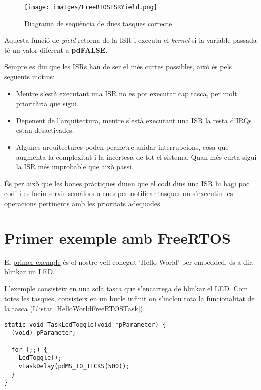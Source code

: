 \begin{figure}
 \centering
 \texttt{[image: imatges/FreeRTOSISRYield.png]}
 \caption{Diagrama de seqüència de dues tasques correcte}
 \label{fig:FreeRTOSISRYield}
\end{figure}

Aquesta funció de {\em yield} retorna de la ISR i executa el {\em kernel} si la variable passada té un valor diferent a {\bf pdFALSE}.

Sempre es diu que les \glspl{ISR} han de ser el més curtes possibles, això és pels següents motius:
\begin{itemize}
 \item Mentre s'està executant una \gls{ISR} no es pot executar cap tasca, per molt prioritària que sigui.
 \item Depenent de l'arquitectura, mentre s'està executant una ISR la resta d'\glspl{IRQ} estan desactivades.
 \item Algunes arquitectures poden permetre anidar interrupcions, cosa que augmenta la complexitat i la incertesa de tot el sistema. Quan més curta sigui la ISR més improbable que això passi.
\end{itemize}

És per això que les bones pràctiques diuen que el codi dins una \gls{ISR} hi hagi poc codi i es facin servir semàfors o cues per notificar tasques on s'executin les operacions pertinents amb les prioritats adequades.

\chapter{Primer exemple amb FreeRTOS}
\label{sec:FreeRTOS_exemple_1}
El \href{https://github.com/mariusmm/cursembedded/tree/master/Simplicity/FreeRTOS_Blink}{primer exemple} és el nostre vell conegut ‘Hello World' per embedded, és a dir, blinkar un LED.

L'exemple consisteix en una sola tasca que s'encarrega de blinkar el LED. Com totes les tasques, consisteix en un bucle infinit on s'inclou tota la funcionalitat de la tasca (Llistat \ref{HelloWorldFreeRTOSTask}).

\begin{lstlisting}[caption={Tasca TaskLedToggle per FreeRTOS},style=customc,label=HelloWorldFreeRTOSTask]
static void TaskLedToggle(void *pParameter) {
  (void) pParameter;

  for (;;) {
    LedToggle();
    vTaskDelay(pdMS_TO_TICKS(500));
  }
}
\end{lstlisting}


